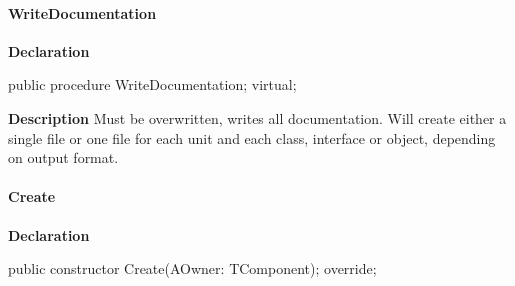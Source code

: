 \documentclass{report}
\newif\ifpdf
\begin{document}
\paragraph*{WriteDocumentation}\hspace*{\fill}

\label{PasDoc_Gen.TDocGenerator-WriteDocumentation}
\begin{list}{}{
\setlength{\itemindent}{0cm}
\setlength{\listparindent}{0cm}
\setlength{\leftmargin}{\evensidemargin}
\addtolength{\leftmargin}{\tmplength}
\settowidth{\labelsep}{X}
\addtolength{\leftmargin}{\labelsep}
\setlength{\labelwidth}{\tmplength}
}
\item[\textbf{Declaration}\hfill]
\ifpdf
\begin{flushleft}
\fi
\begin{ttfamily}
public procedure WriteDocumentation; virtual;\end{ttfamily}

\ifpdf
\end{flushleft}
\fi

\par
\item[\textbf{Description}]
Must be overwritten, writes all documentation. Will create either a single file or one file for each unit and each class, interface or object, depending on output format.

\end{list}
\paragraph*{Create}\hspace*{\fill}

\label{PasDoc_Gen.TDocGenerator-Create}
\begin{list}{}{
\setlength{\itemindent}{0cm}
\setlength{\listparindent}{0cm}
\setlength{\leftmargin}{\evensidemargin}
\addtolength{\leftmargin}{\tmplength}
\settowidth{\labelsep}{X}
\addtolength{\leftmargin}{\labelsep}
\setlength{\labelwidth}{\tmplength}
}
\item[\textbf{Declaration}\hfill]
\ifpdf
\begin{flushleft}
\fi
\begin{ttfamily}
public constructor Create(AOwner: TComponent); override;\end{ttfamily}

\ifpdf
\end{flushleft}
\fi

\end{list}
\end{document}
